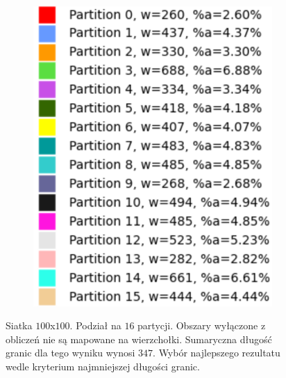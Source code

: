 \begin{figure}[h]
\begin{subfigure}{.33\textwidth}
    \caption[short]{}
\end{subfigure}%
\begin{subfigure}{.33\textwidth}
    \centering
    \includegraphics[width=0.9\linewidth]{images/results/m_k/with/16/results}
    \caption[short]{}
\end{subfigure}
\caption{Siatka $100$x$100$. Podział na $16$ partycji.
Obszary wyłączone z obliczeń nie są mapowane na wierzchołki.
Sumaryczna długość granic dla tego wyniku wynosi $347$.
Wybór najlepszego rezultatu wedle kryterium najmniejszej długości granic.}
\label{result:16}
    
\end{figure}
